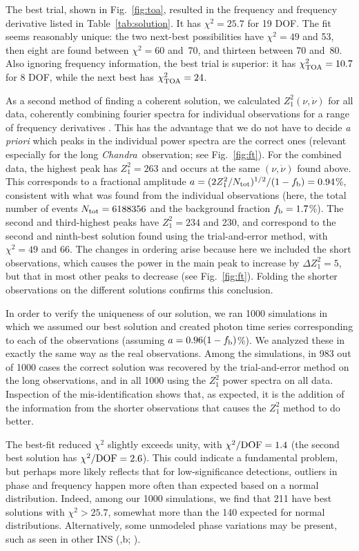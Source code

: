 \documentclass{emulateapj}\usepackage{apjfonts}
\newcommand{\cxo}{{\em Chandra}}
\begin{document}
The best trial, shown in Fig.~\ref{fig:toa}, resulted in the frequency
and frequency derivative listed in Table~\ref{tab:solution}.  It has
$\chi^2=25.7$ for 19 DOF.  The fit seems reasonably unique: the two
next-best possibilities have $\chi^2=49$ and 53, then eight are found
between $\chi^2=60$ and~70, and thirteen between 70 and~80.  Also
ignoring frequency information, the best trial is superior: it has
$\chi_{\rm TOA}^2=10.7$ for 8 DOF, while the next best has $\chi_{\rm
  TOA}^2=24$.

As a second method of finding a coherent solution, we calculated
$Z_1^2(\nu,\dot\nu)$ for all data, coherently combining fourier
spectra for individual observations for a range of frequency
derivatives \citep{rem02}.  This has the advantage that we do not have
to decide {\em a priori} which peaks in the individual power spectra
are the correct ones (relevant especially for the long
\cxo\ observation; see Fig.~\ref{fig:ft}).  For the combined data, the
highest peak has $Z_1^2=263$ and occurs at the same $(\nu,\dot\nu)$
found above.  This corresponds to a fractional amplitude
$a=(2Z_1^2/N_{\rm tot})^{1/2}/(1-f_{\rm b})=0.94$\%, consistent with
what was found from the individual observations (here, the total
number of events $N_{\rm tot}=6188356$ and the background fraction
$f_{\rm b}=1.7$\%).  The second and third-highest peaks have
$Z_1^2=234$ and 230, and correspond to the second and ninth-best
solution found using the trial-and-error method, with $\chi^2=49$ and
66.  The changes in ordering arise because here we included the short
observations, which causes the power in the main peak to increase by
$\Delta Z_1^2=5$, but that in most other peaks to decrease (see
Fig.~\ref{fig:ft}).  Folding the shorter observations on the different
solutions confirms this conclusion.


In order to verify the uniqueness of our solution, we ran 1000
simulations in which we assumed our best solution and created photon
time series corresponding to each of the observations (assuming
$a=0.96(1-f_{\rm b})$\%).  We analyzed these in exactly the same way
as the real observations.  Among the simulations, in 983 out of 1000
cases the correct solution was recovered by the trial-and-error method
on the long observations,
and in all 1000 using the $Z_1^2$ power spectra on all data.
Inspection of the mis-identification shows that, as expected,
it is the addition of the information from the shorter observations
that causes the $Z_1^2$ method to do better.

The best-fit reduced $\chi^2$ slightly exceeds unity, with
$\chi^2/{\rm DOF}=1.4$ (the second best solution has $\chi^2/{\rm
  DOF}=2.6$).  This could indicate a fundamental problem, but perhaps
more likely reflects that for low-significance detections, outliers in
phase and frequency happen more often than expected based on a normal
distribution.  Indeed, among our 1000 simulations, we find that 211
have best solutions with $\chi^2>25.7$, somewhat more than the 140
expected for normal distributions.  Alternatively, some unmodeled
phase variations may be present, such as seen in other INS
(,b; \citealt{vkkpm07}).
\end{document}
